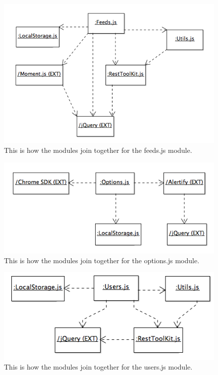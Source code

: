 \documentclass{article}
\begin{document}
\begin{figure}[H]
\centering
\includegraphics[width=\textwidth]{feedsclass}
\caption{This is how the modules join together for the feeds.js module.}
\end{figure}

\begin{figure}[H]
\centering
\includegraphics[width=\textwidth]{optiondiagram}
\caption{This is how the modules join together for the options.js module.}
\end{figure}

\begin{figure}[H]
\centering
\includegraphics[width=\textwidth]{usersdiagram}
\caption{This is how the modules join together for the users.js module.}
\end{figure}
\end{document}
